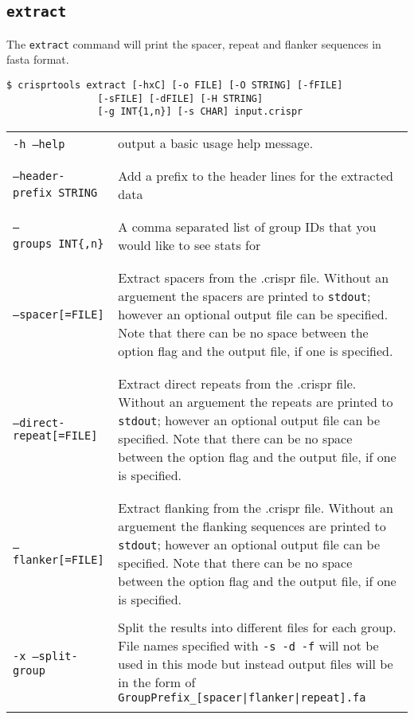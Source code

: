 \documentclass[11pt]{article} %
\newcommand{\optionflag}[1]{\texttt{-#1}}
\newcommand{\optionflagarg}[2]{\optionflag{#1}\ \texttt{#2}}
\newcommand{\optionflagoptargnospace}[2]{\optionflag{#1}\texttt{[#2]}}
\newcommand{\longoptionflag}[1]{\texttt{--#1}}
\newcommand{\longoptionflagarg}[2]{\longoptionflag{#1}\ \texttt{#2}}
\newcommand{\longoptionflagoptargnospace}[2]{\longoptionflag{#1}\texttt{[=#2]}}
\newcommand{\combinedoptionflag}[2]{\optionflag{#1}\ \longoptionflag{#2}}
\newcommand{
	\combinedoptionflagarg}[3]{
		\shortstack[l]{
			\optionflagarg{#1}{#3} \\ \longoptionflagarg{#2}{#3}
		}
	}
\newcommand{
	\combinedoptionflagoptargnospace}[3]{
		\shortstack[l]{
			\optionflagoptargnospace{#1}{#3} \\ \longoptionflagoptargnospace{#2}{#3}
		}
	}
\begin{document}
\subsection{\lstinline$extract$}
\label{sec:ctextract}
The \texttt{extract} command will print the spacer, repeat and flanker sequences in fasta format. 
\begin{lstlisting}
$ crisprtools extract [-hxC] [-o FILE] [-O STRING] [-fFILE] 
				[-sFILE] [-dFILE] [-H STRING] 
				[-g INT{1,n}] [-s CHAR] input.crispr
\end{lstlisting}
 \begin{longtable}{  l    p{10cm} }

 \combinedoptionflag{h}{help} & output a basic usage help message. \\ \\
\combinedoptionflagarg{H}{header-prefix}{STRING} & Add a prefix to the header lines for the extracted data \\ \\
\combinedoptionflagarg{g}{groups}{INT\{,n\}} & A comma separated list of group IDs that you would like to see stats for \\ \\
\combinedoptionflagoptargnospace{s}{spacer}{FILE} & Extract spacers from the .crispr file.  Without an arguement the spacers are printed to \texttt{stdout}; however an optional output file can be specified.  Note that there can be no space between the option flag and the output file, if one is specified. \\ \\
\combinedoptionflagoptargnospace{d}{direct-repeat}{FILE} & Extract direct repeats from the .crispr file. Without an arguement the repeats are printed to \texttt{stdout}; however an optional output file can be specified.  Note that there can be no space between the option flag and the output file, if one is specified. \\ \\
\combinedoptionflagoptargnospace{f}{flanker}{FILE} & Extract flanking from the .crispr file. Without an arguement the flanking sequences are printed to \texttt{stdout}; however an optional output file can be specified.  Note that there can be no space between the option flag and the output file, if one is specified. \\ \\
\combinedoptionflag{x}{split-group} & Split the results into different files for each group.  File names specified with \optionflag{s}\ \optionflag{d}\ \optionflag{f} will not be used in this mode but instead output files will be in the form of \texttt{GroupPrefix\_[spacer|flanker|repeat].fa}\\ \\

\end{longtable}
\end{document}
